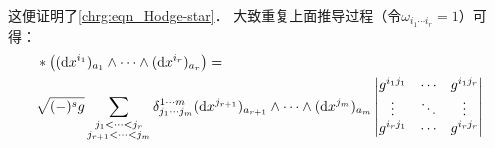 这便证明了\eqref{chrg:eqn_Hodge-star}．
大致重复上面推导过程（令$\omega_{i_1\cdots i_r}=1$）可得：
\setlength{\mathindent}{0em}
\begin{align}
    &*\bigl( ({\rm d}x^{i_{1}})_{a_{1}} \wedge \cdots \wedge ({\rm d}x^{i_r})_{a_r}\bigr) =\notag \\
    & \sqrt{(-)^s g} \sum_{\substack {j_1<\cdots<j_r \\ j_{r+1}<\cdots<j_m}}
    \delta_{j_1 \cdots j_m}^{1 \cdots m}
    ({\rm d}x^{j_{r+1}})_{a_{r+1}} \wedge \cdots \wedge ({\rm d}x^{j_m})_{a_m}
    \begin{vmatrix}
        g^{i_1 j_1} & \cdots & g^{i_1 j_r}  \\
        \vdots & \ddots & \vdots \\
        g^{i_r j_1} & \cdots & g^{i_r j_r}  \\
    \end{vmatrix}    \label{chrg:eqn_dx1r-Hodge}
\end{align}\setlength{\mathindent}{2em}
